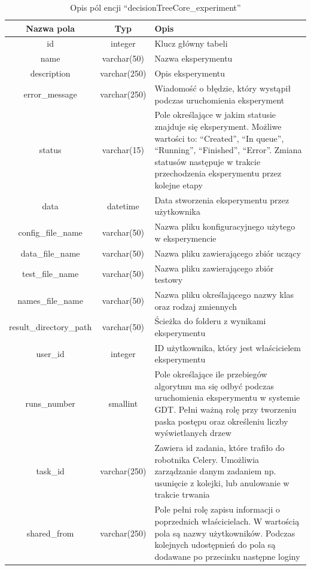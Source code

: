 \begin{table}[htb]
	\centering
	\begin{tabular}{|c|c|p{9cm}|}
		\hline
		\textbf{Nazwa pola} & \textbf{Typ} & \textbf{Opis} \\\hline
		id & integer & Klucz główny tabeli \\\hline
		name & varchar(50) & Nazwa eksperymentu\\\hline
		description & varchar(250) & Opis eksperymentu\\\hline
		error\_message & varchar(250) & Wiadomość o błędzie, który wystąpił podczas uruchomienia eksperyment\\\hline
		status & varchar(15) & Pole określające w jakim statusie znajduje się eksperyment. Możliwe wartości to: \enquote{Created}, \enquote{In queue}, \enquote{Running}, \enquote{Finished}, \enquote{Error}. Zmiana statusów następuje w trakcie przechodzenia eksperymentu przez kolejne etapy\\\hline
		data & datetime & Data stworzenia eksperymentu przez użytkownika\\\hline
		config\_file\_name & varchar(50) & Nazwa pliku konfiguracyjnego użytego w eksperymencie\\\hline
		data\_file\_name & varchar(50) & Nazwa pliku zawierającego zbiór uczący \\\hline
		test\_file\_name & varchar(50) & Nazwa pliku zawierającego zbiór testowy \\\hline
		names\_file\_name & varchar(50) & Nazwa pliku określającego nazwy klas oraz rodzaj zmiennych \\\hline
		result\_directory\_path & varchar(50) & Ścieżka do folderu z wynikami eksperymentu\\\hline
		user\_id & integer & ID użytkownika, który jest właścicielem eksperymentu \\\hline
		runs\_number & smallint & Pole określające ile przebiegów algorytmu ma się odbyć podczas uruchomienia eksperymentu w systemie GDT. Pełni ważną rolę przy tworzeniu paska postępu oraz określeniu liczby wyświetlanych drzew\\\hline
		task\_id & varchar(250) & Zawiera id zadania, które trafiło do robotnika Celery. Umożliwia zarządzanie danym zadaniem np. usunięcie z kolejki, lub anulowanie w trakcie trwania\\\hline
		shared\_from & varchar(250) & Pole pełni rolę zapisu informacji o poprzednich właścicielach. W wartością pola są nazwy użytkowników. Podczas kolejnych udostępnień do pola są dodawane po przecinku następne loginy  \\\hline
	\end{tabular}
	\caption[Opis pól encji \enquote{decisionTreeCore\_experiment}]{ Opis pól encji \enquote{decisionTreeCore\_experiment}}
	\label{tabela_1_schema_experiment}
\end{table}

